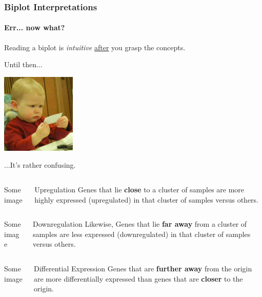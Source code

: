 \documentclass[serif]{beamer}
\begin{document}
	\begin{frame}[t]
		\frametitle{Biplot Interpretations}
		\framesubtitle{Err... now what?}
	
		{
		\large
		\begin{block}{\vspace{-0.5in}}
			Reading a biplot is \emph{intuitive} \underline{after} you grasp the concepts. 	
		\end{block}
		\raggedright Until then...
		\begin{center}
			\includegraphics[height=1.5in]{images/confused}	
		\end{center}
		\raggedleft ...It's rather confusing.
		}
		
		{
			\begin{columns}
				\begin{column}{1.5in}
					Some image
				\end{column}
				\begin{column}{2.5in}
					\begin{block}{Upregulation}	
						Genes that lie \textbf{close} to a cluster of samples are more highly expressed (upregulated) in that cluster of samples versus others.
					\end{block}
				\end{column}
			\end{columns}
			\vspace{0.30in}
			\begin{columns}
				\begin{column}{1.5in}
					Some image
				\end{column}
				\begin{column}{2.5in}
					\begin{block}{Downregulation}
						Likewise, Genes that lie \textbf{far away} from a cluster of samples are less expressed (downregulated) in that cluster of samples versus others.
					\end{block}
				\end{column}
			\end{columns}
		}
		
		\only<3>
		{
			\vspace{0.75in}
			\begin{columns}
				\begin{column}{1.5in}
					Some image
				\end{column}
				\begin{column}{2.5in}
					\begin{block}{Differential Expression}
						Genes that are \textbf{further away} from the origin are more differentially expressed than genes that are \textbf{closer} to the origin.
					\end{block}
				\end{column}
			\end{columns}
		}
		

\end{frame}
\end{document}
